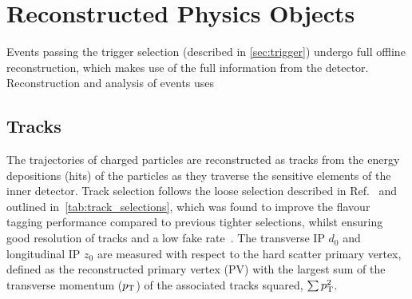 









\section{Reconstructed Physics Objects}\label{sec:physics-objects}

Events passing the trigger selection (described in \cref{sec:trigger}) undergo full offline reconstruction, which makes use of the full information from the detector.
Reconstruction and analysis of events uses \cite{ATL-SOFT-PUB-2021-001}



\subsection{Tracks}\label{sec:tracks}

The trajectories of charged particles are reconstructed as tracks from the energy depositions (hits) of the particles as they traverse the sensitive elements of the inner detector.
Track selection follows the loose selection described in Ref.~\cite{ATL-PHYS-PUB-2020-014} and outlined in~\cref{tab:track_selections}, which was found to improve the flavour tagging performance compared to previous tighter selections, whilst ensuring good resolution of tracks and a low fake rate~\cite{PERF-2015-08}.
The transverse IP $d_0$ and longitudinal IP $z_0$ are measured with respect to the hard scatter primary vertex, defined as the reconstructed primary vertex (PV) with the largest sum of the transverse momentum ($p_{\text{T}}$) of the associated tracks squared, $\sum p_{\text{T}}^2$.

